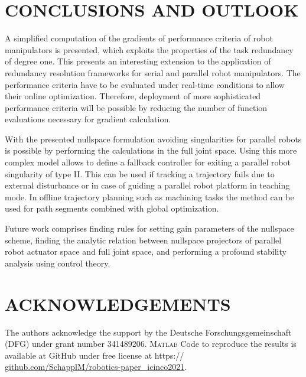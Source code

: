 \documentclass[a4paper,twoside]{article}
\begin{document}
\section{\uppercase{Conclusions and Outlook}}
\label{sec:conclusion}

A simplified computation of the gradients of performance criteria of robot manipulators is presented, which exploits the properties of the task redundancy of degree one.
This presents an interesting extension to the application of redundancy resolution frameworks for serial and parallel robot manipulators.
The performance criteria have to be evaluated under real-time conditions to allow their online optimization.
Therefore, deployment of more sophisticated performance criteria will be possible by reducing the number of function evaluations necessary for gradient calculation.

With the presented nullspace formulation avoiding singularities for parallel robots is possible by performing the calculations in the full joint space.
Using this more complex model allows to define a fallback controller for exiting a parallel robot singularity of type II.
This can be used if tracking a trajectory fails due to external disturbance or in case of guiding a parallel robot platform in teaching mode.
In offline trajectory planning such as machining tasks the method can be used for path segments combined with global optimization.

Future work comprises finding rules for setting gain parameters of the nullspace scheme, finding the analytic relation between nullspace projectors of parallel robot actuator space and full joint space, and performing a profound stability analysis using control theory.



\vfill
\section*{\uppercase{Acknowledgements}}

The authors acknowledge the support by the Deutsche Forschungsgemeinschaft (DFG) under grant number 341489206.
\textsc{Matlab} Code to reproduce the results is available at GitHub under free license at https://\\\url{github.com/SchapplM/robotics-paper_icinco2021}.


{\small
}


\end{document}

